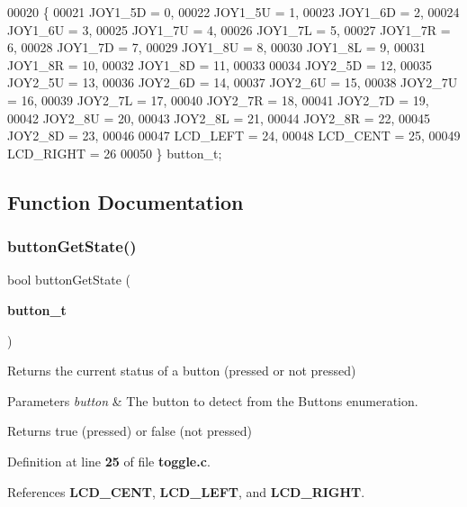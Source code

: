 \begin{DoxyCode}
00020              \{
00021     JOY1_5D = 0,
00022     JOY1_5U = 1,
00023     JOY1_6D = 2,
00024     JOY1_6U = 3,
00025     JOY1_7U = 4,
00026     JOY1_7L = 5,
00027     JOY1_7R = 6,
00028     JOY1_7D = 7,
00029     JOY1_8U = 8,
00030     JOY1_8L = 9,
00031     JOY1_8R = 10,
00032     JOY1_8D = 11,
00033 
00034     JOY2_5D = 12,
00035     JOY2_5U = 13,
00036     JOY2_6D = 14,
00037     JOY2_6U = 15,
00038     JOY2_7U = 16,
00039     JOY2_7L = 17,
00040     JOY2_7R = 18,
00041     JOY2_7D = 19,
00042     JOY2_8U = 20,
00043     JOY2_8L = 21,
00044     JOY2_8R = 22,
00045     JOY2_8D = 23,
00046 
00047     LCD_LEFT = 24,
00048     LCD_CENT = 25,
00049     LCD_RIGHT = 26
00050 \} button_t;
\end{DoxyCode}


\subsection{Function Documentation}
\mbox{\label{toggle_8h_a72989c21af9d14672f6e59c44a2b59bc}} 
\subsubsection{button\+Get\+State()}
{\footnotesize\ttfamily bool button\+Get\+State (\begin{DoxyParamCaption}\item[{\textbf{ button\+\_\+t}}]{ }\end{DoxyParamCaption})}



Returns the current status of a button (pressed or not pressed) 


\begin{DoxyParams}{Parameters}
{\em button} & The button to detect from the Buttons enumeration.\\
\hline
\end{DoxyParams}
\begin{DoxyReturn}{Returns}
true (pressed) or false (not pressed) 
\end{DoxyReturn}


Definition at line \textbf{ 25} of file \textbf{ toggle.\+c}.



References \textbf{ L\+C\+D\+\_\+\+C\+E\+NT}, \textbf{ L\+C\+D\+\_\+\+L\+E\+FT}, and \textbf{ L\+C\+D\+\_\+\+R\+I\+G\+HT}.




